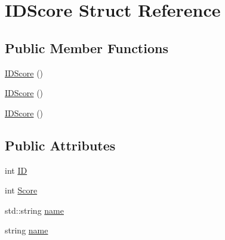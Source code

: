 \hypertarget{structIDScore}{\section{I\-D\-Score Struct Reference}
\label{structIDScore}
}
\subsection*{Public Member Functions}
\begin{DoxyCompactItemize}
\item 
\hyperlink{structIDScore_a718410e0d61d036a544f5557a4b51a00}{I\-D\-Score} ()
\item 
\hyperlink{structIDScore_a718410e0d61d036a544f5557a4b51a00}{I\-D\-Score} ()
\item 
\hyperlink{structIDScore_a718410e0d61d036a544f5557a4b51a00}{I\-D\-Score} ()
\end{DoxyCompactItemize}
\subsection*{Public Attributes}
\begin{DoxyCompactItemize}
\item 
int \hyperlink{structIDScore_aa922f6f013ed4fcbd873b5a218aaf35d}{I\-D}
\item 
int \hyperlink{structIDScore_a7aa85c456227f2ac20dd7b55383daa4f}{Score}
\item 
std\-::string \hyperlink{structIDScore_ab16cc900e480c63706a899f89ececc71}{name}
\item 
string \hyperlink{structIDScore_a8c84842bb34c060bde8a3f9d5ee462a5}{name}
\end{DoxyCompactItemize}



